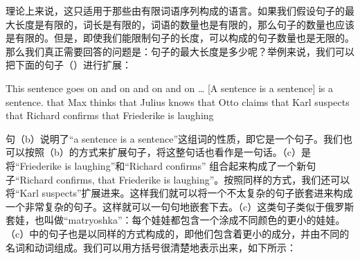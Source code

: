 理论上来说，这只适用于那些由有限词语序列构成的语言。如果我们假设句子的最大长度是有限的，词长是有限的，词语的数量也是有限的，那么句子的数量也应该是有限的。但是，即使我们能限制句子的长度，可以构成的句子数量也是无限的。那么我们真正需要回答的问题是：句子的最大长度是多少呢？举例来说，我们可以把下面的句子（）进行扩展：

\eal 
\ex This sentence goes on and on and on and on \ldots 
\ex {}[A sentence is a sentence] is a sentence.
\ex\label{einbettung-dass-Saetze}
that Max thinks that Julius knows that Otto claims that Karl suspects that Richard confirms that Friederike is laughing
\zl

句（b）说明了“a sentence is a sentence”这组词的性质，即它是一个句子。我们也可以按照（b）的方式来扩展句子，将这整句话也看作是一句话。（c）是将“Friederike is laughing”和“Richard confirms” 组合起来构成了一个新句子“Richard confirms, that Friederike is laughing”。按照同样的方式，我们还可以将“Karl suspects”扩展进来。这样我们就可以将一个不太复杂的句子嵌套进来构成一个非常复杂的句子。这样就可以一句句地嵌套下去。（c）这类句子类似于俄罗斯套娃，也叫做“matryoshka”：每个娃娃都包含一个涂成不同颜色的更小的娃娃。（c）中的句子也是以同样的方式构成的，即他们包含着更小的成分，并由不同的名词和动词组成。我们可以用方括号很清楚地表示出来，如下所示：

